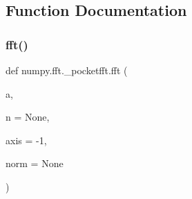 \subsection{Function Documentation}
\mbox{\label{namespacenumpy_1_1fft_1_1__pocketfft_a31595a509daa5cadd8c6f7f843d94b04}} 
\subsubsection{\texorpdfstring{fft()}{fft()}}
{\footnotesize\ttfamily def numpy.\+fft.\+\_\+pocketfft.\+fft (\begin{DoxyParamCaption}\item[{}]{a,  }\item[{}]{n = {\ttfamily None},  }\item[{}]{axis = {\ttfamily -\/1},  }\item[{}]{norm = {\ttfamily None} }\end{DoxyParamCaption})}

